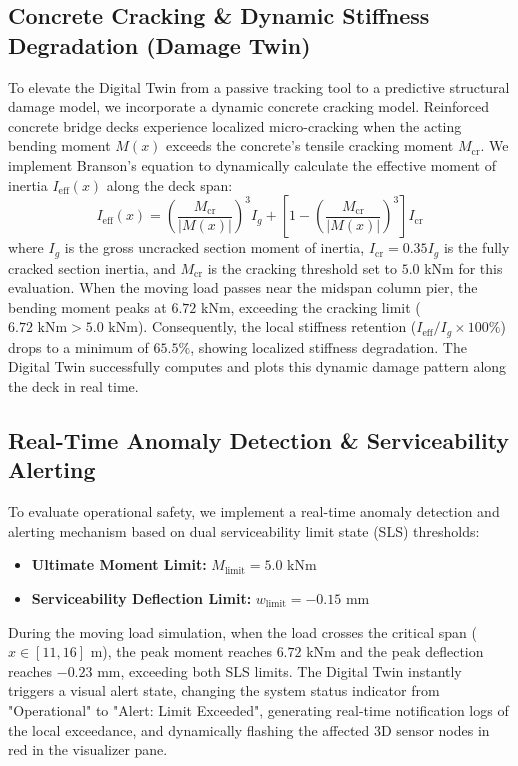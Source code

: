 \documentclass[11pt,journal,onecolumn]{IEEEtran}
\begin{document}
\subsection{Concrete Cracking \& Dynamic Stiffness Degradation (Damage Twin)}
To elevate the Digital Twin from a passive tracking tool to a predictive structural damage model, we incorporate a dynamic concrete cracking model. Reinforced concrete bridge decks experience localized micro-cracking when the acting bending moment $M(x)$ exceeds the concrete's tensile cracking moment $M_{\text{cr}}$. We implement Branson's equation to dynamically calculate the effective moment of inertia $I_{\text{eff}}(x)$ along the deck span:
\begin{equation}
    I_{\text{eff}}(x) = \left(\frac{M_{\text{cr}}}{|M(x)|}\right)^3 I_g + \left[1 - \left(\frac{M_{\text{cr}}}{|M(x)|}\right)^3\right] I_{\text{cr}}
\end{equation}
where $I_g$ is the gross uncracked section moment of inertia, $I_{\text{cr}} = 0.35 I_g$ is the fully cracked section inertia, and $M_{\text{cr}}$ is the cracking threshold set to $5.0$ kNm for this evaluation. When the moving load passes near the midspan column pier, the bending moment peaks at $6.72$ kNm, exceeding the cracking limit ($6.72\text{ kNm} > 5.0\text{ kNm}$). Consequently, the local stiffness retention ($I_{\text{eff}}/I_g \times 100\%$) drops to a minimum of $65.5\%$, showing localized stiffness degradation. The Digital Twin successfully computes and plots this dynamic damage pattern along the deck in real time.

\subsection{Real-Time Anomaly Detection \& Serviceability Alerting}
To evaluate operational safety, we implement a real-time anomaly detection and alerting mechanism based on dual serviceability limit state (SLS) thresholds:
\begin{itemize}
    \item \textbf{Ultimate Moment Limit:} $M_{\text{limit}} = 5.0$ kNm
    \item \textbf{Serviceability Deflection Limit:} $w_{\text{limit}} = -0.15$ mm
\end{itemize}
During the moving load simulation, when the load crosses the critical span ($x \in [11, 16]$ m), the peak moment reaches $6.72$ kNm and the peak deflection reaches $-0.23$ mm, exceeding both SLS limits. The Digital Twin instantly triggers a visual alert state, changing the system status indicator from "Operational" to "Alert: Limit Exceeded", generating real-time notification logs of the local exceedance, and dynamically flashing the affected 3D sensor nodes in red in the visualizer pane.
\end{document}

